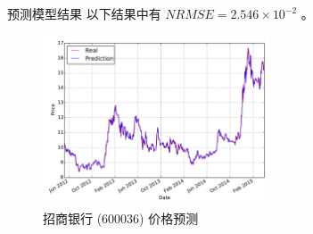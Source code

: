 \documentclass{beamer}
\begin{document}
\begin{frame}{预测模型}{结果}
以下结果中有 $NRMSE=2.546\times 10^{-2}$ 。

\begin{figure}
  \includegraphics[width=0.6\textwidth]{plots/price_forecast_regression_line.pdf}
  \caption{招商银行 (600036) 价格预测}
\end{figure}
\end{frame}
\end{document}
